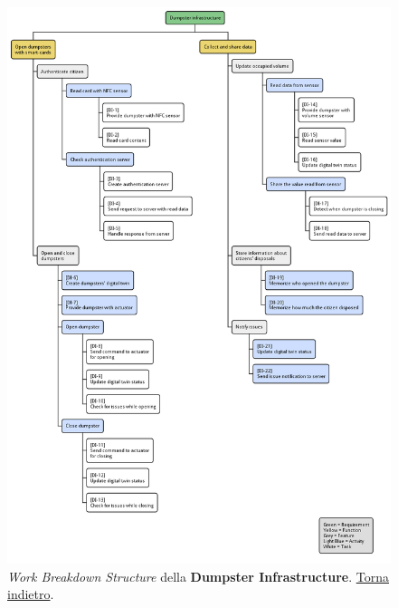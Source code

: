 \begin{figure}[H]
    \centering
    \includegraphics[width=\textwidth]{../img/wbs-dumpster-infrastructure.pm}
    \caption{\textit{Work Breakdown Structure} della \textbf{Dumpster Infrastructure}. \hyperlink{back:wbs-dumpster-infrastructure}{Torna indietro}.}
    \label{fig:wbs-dumpster-infrastructure}
\end{figure}

